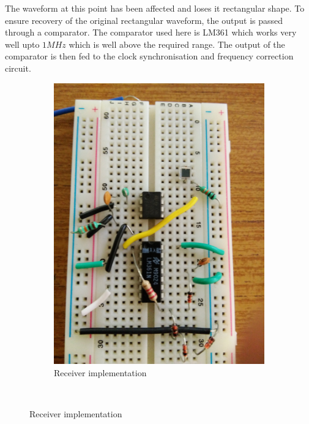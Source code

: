 \documentclass{article}
\begin{document}
The waveform at this point has been affected and loses it rectangular shape. To ensure recovery of the original rectangular waveform, the output is passed through a comparator. The comparator used here is LM361 which works very well upto $1 MHz$ which is well above the required range. The output of the comparator is then fed to the clock synchronisation and frequency correction circuit.


\begin{figure}[h]
\begin{subfigure}[t]{0.5\textwidth}
	\centering
	\includegraphics[scale = 0.4]{images/Receiver.jpg}
	\caption{Receiver implementation}
	\label{Fig :1b}
\end{subfigure}
~

\end{figure}
\end{document}
